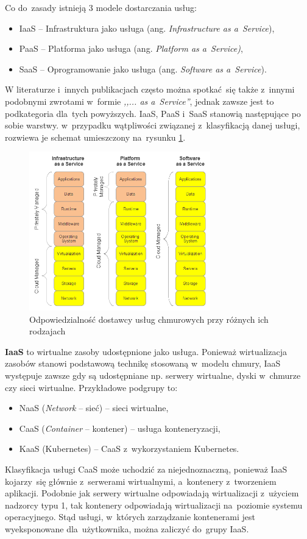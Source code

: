 \documentclass[12pt,a4paper,twoside,titlepage,openright]{book}
\begin{document}
Co do~zasady istnieją 3 modele dostarczania usług:
\begin{itemize}
\item IaaS -- Infrastruktura jako usługa (ang. \textit{Infrastructure as a~Service}),
\item PaaS -- Platforma jako usługa (ang. \textit{Platform as a~Service)},
\item SaaS -- Oprogramowanie jako usługa (ang. \textit{Software as a~Service}).
\end{itemize}
W literaturze i~innych publikacjach często można spotkać~się także z~innymi podobnymi zwrotami w~formie \textit{,,... as a~Service''}, jednak zawsze jest to podkategoria dla~tych powyższych. IaaS, PaaS i~SaaS stanowią następujące po sobie warstwy. w~przypadku wątpliwości związanej z~klasyfikacją danej usługi, rozwiewa je schemat umieszczony na~rysunku \ref{fig:iaas-paas-saas}.

\begin{figure}[h]
	\centering
			\includegraphics[width=0.7\textwidth]{iaas-paas-saas.png}
		\caption{Odpowiedzialność dostawcy usług chmurowych przy różnych ich rodzajach \cite{iotArchitects}}
		\label{fig:iaas-paas-saas}
\end{figure}

\textbf{IaaS} to wirtualne zasoby udostępnione jako usługa. Ponieważ wirtualizacja zasobów stanowi podstawową technikę stosowaną w~modelu chmury, IaaS występuje zawsze gdy są udostępniane np. serwery wirtualne, dyski w~chmurze czy sieci wirtualne. Przykładowe podgrupy to:
\begin{itemize}
\item NaaS (\textit{Network} -- sieć) -- sieci wirtualne,
\item CaaS (\textit{Container} -- kontener) -- usługa konteneryzacji,
\item KaaS (Kubernetes) -- CaaS z~wykorzystaniem Kubernetes.
\end{itemize}
Klasyfikacja usługi CaaS może uchodzić za niejednoznaczną, ponieważ IaaS kojarzy~się głównie z~serwerami wirtualnymi, a~kontenery z~tworzeniem aplikacji. Podobnie jak serwery wirtualne odpowiadają wirtualizacji z~użyciem nadzorcy typu 1, tak kontenery odpowiadają wirtualizacji na~poziomie systemu operacyjnego. Stąd usługi, w~których zarządzanie kontenerami jest wyeksponowane dla~użytkownika, można zaliczyć do~grupy IaaS.
\end{document}
